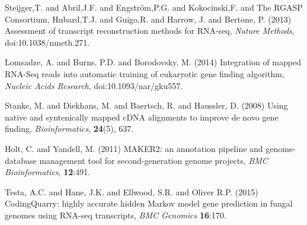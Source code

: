 \documentclass{bioinfo}
\begin{document}
\begin{thebibliography}{}
 Steijger,T. and Abril,J.F. and Engstr\"{o}m,P.G. and Kokocinski,F. and The RGASP Consortium, Hubard,T.J. and Guigo,R. and Harrow, J. and Bertone, P. (2013) Assessment of transcript reconstruction methods for
 RNA-seq, {\it Nature Methods}, doi:10.1038/nmeth.271.

 Lomsadze, A. and Burns, P.D. and Borodovsky, M. (2014) Integration of mapped RNA-Seq reads into automatic training of eukaryotic gene finding algorithm, {\it Nucleic Acids Research}, doi:10.1093/nar/gku557.

Stanke, M. and Diekhans, M. and Baertsch, R. and Haussler, D. (2008) Using native and syntenically mapped cDNA alignments to improve de novo gene finding, \textit{Bioinformatics}, \textbf{24}(5), 637.

 Holt, C. and Yandell, M. (2011) MAKER2: an annotation pipeline and genome-database management tool for second-generation genome projects, \textit{BMC Bioinformatics}, \textbf{12}:491.

 Testa, A.C. and Hane, J.K. and Ellwood, S.R. and Oliver R.P. (2015) CodingQuarry: highly accurate hidden Markov model gene prediction in fungal genomes using RNA-seq transcripts, \textit{BMC Genomics} \textbf{16}:170.



\end{thebibliography}
\end{document}
